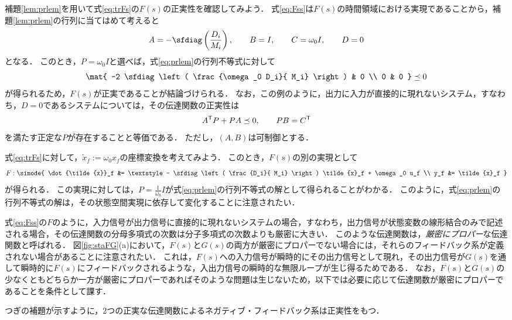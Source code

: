 \documentclass[a4j,10pt,oneside,openany,dvipdfmx]{jsbook}
\begin{document}
\begin{example}\label{ex:Fspr2}
補題\ref{lem:prlem}を用いて式\eqref{eq:trFs}の$F(s)$の正実性を確認してみよう．
式\eqref{eq:Fss}は$F(s)$の時間領域における実現であることから，補題\ref{lem:prlem}の行列に当てはめて考えると
\[
A = -\sfdiag \left( 
\frac{D_i}{ M_i} 
\right)
,\qquad 
B= I
,\qquad
C= \omega_0 I 
,\qquad
D=0
\]
となる．
このとき，$P=\omega_0 I$と選べば，式\eqref{eq:prlem}の行列不等式に対して
\[
\mat{
-2 \sfdiag \left( 
\frac{\omega_0 D_i}{ M_i} 
\right)
 & 0 \\
0 & 0
}\preceq 0
\]
が得られるため，$F(s)$が正実であることが結論づけられる．
なお，この例のように，出力に入力が直接的に現れないシステム，すなわち，$D=0$であるシステムについては，その伝達関数の正実性は
\begin{equation}\label{eq:Dzero}
A^{\sf T}P+PA \preceq 0
,\qquad 
PB=C^{\sf T}
\end{equation}
を満たす正定な$P$が存在することと等価である．
ただし，$(A,B)$は可制御とする．


式\eqref{eq:trFs}に対して，$\tilde{x}_f := \omega_0 x_f$の座標変換を考えてみよう．
このとき，$F(s)$の別の実現として
\[
F: \simode{
\dot{\tilde{x}}_f &= \textstyle - \sfdiag \left( 
\frac{D_i}{ M_i} 
\right)
\tilde{x}_f
+ \omega_0 u_f \\
y_f &=  \tilde{x}_f
}
\]
が得られる．
この実現に対しては，$P=\frac{1}{\omega_0}I$が式\eqref{eq:prlem}の行列不等式の解として得られることがわかる．
このように，式\eqref{eq:prlem}の行列不等式の解は，その状態空間実現に依存して変化することに注意されたい．
\end{example}

式\eqref{eq:Fss}の$F$のように，入力信号が出力信号に直接的に現れないシステムの場合，すなわち，出力信号が状態変数の線形結合のみで記述される場合，その伝達関数の分母多項式の次数は分子多項式の次数よりも厳密に大きい．
このような伝達関数は，\emph{厳密にプロパー}な伝達関数と呼ばれる．
図\ref{fig:staFG}(a)において，$F(s)$と$G(s)$の両方が厳密にプロパーでない場合には，それらのフィードバック系が定義されない場合があることに注意されたい．
これは，$F(s)$への入力信号が瞬時的にその出力信号として現れ，その出力信号が$G(s)$を通して瞬時的に$F(s)$にフィードバックされるような，入出力信号の瞬時的な無限ループが生じ得るためである．
なお，$F(s)$と$G(s)$の少なくともどちらか一方が厳密にプロパーであればそのような問題は生じないため，以下では必要に応じて伝達関数が厳密にプロパーであることを条件として課す．

つぎの補題が示すように，2つの正実な伝達関数によるネガティブ・フィードバック系は正実性をもつ．
\end{document}
